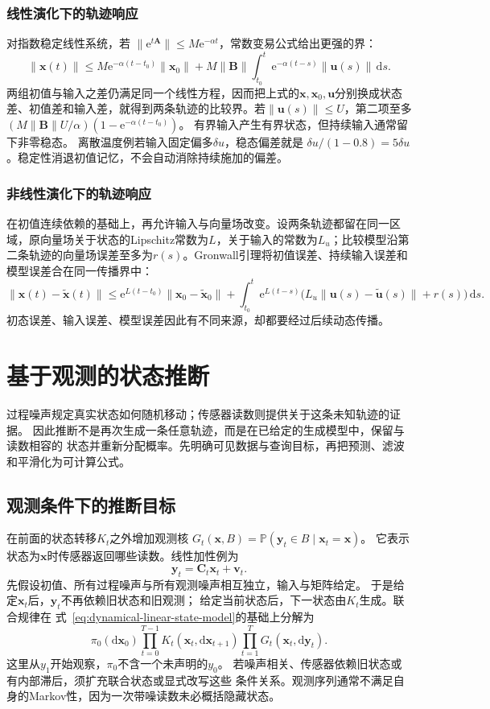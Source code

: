 \subsubsection{线性演化下的轨迹响应}
对指数稳定线性系统，若
$\|\mathrm e^{t\bm A}\|\leq M\mathrm e^{-\alpha t}$，常数变易公式给出更强的界：
\[
  \|\bm x(t)\|
  \leq M\mathrm e^{-\alpha(t-t_0)}\|\bm x_0\|
  +M\|\bm B\|\int_{t_0}^t\mathrm e^{-\alpha(t-s)}\|\bm u(s)\|\,\mathrm ds.
\]
两组初值与输入之差仍满足同一个线性方程，因而把上式的$\bm x,\bm x_0,\bm u$分别换成状态差、初值差和输入差，就得到两条轨迹的比较界。若$\|\bm u(s)\|\leq U$，第二项至多
$(M\|\bm B\|U/\alpha)(1-\mathrm e^{-\alpha(t-t_0)})$。
有界输入产生有界状态，但持续输入通常留下非零稳态。
离散温度例若输入固定偏多$\delta u$，稳态偏差就是
$\delta u/(1-0.8)=5\delta u$。稳定性消退初值记忆，不会自动消除持续施加的偏差。

\subsubsection{非线性演化下的轨迹响应}
在初值连续依赖的基础上，再允许输入与向量场改变。设两条轨迹都留在同一区域，原向量场关于状态的Lipschitz常数为$L$，关于输入的常数为$L_u$；比较模型沿第二条轨迹的向量场误差至多为$r(s)$。Gronwall引理将初值误差、持续输入误差和模型误差合在同一传播界中：
\[
  \|\bm x(t)-\widetilde{\bm x}(t)\|
  \leq \mathrm e^{L(t-t_0)}\|\bm x_0-\widetilde{\bm x}_0\|
  +\int_{t_0}^t\mathrm e^{L(t-s)}
     \bigl(L_u\|\bm u(s)-\widetilde{\bm u}(s)\|+r(s)\bigr)\,\mathrm ds.
\]
初态误差、输入误差、模型误差因此有不同来源，却都要经过后续动态传播。

\section{基于观测的状态推断}
\label{sec:dynamical-state-space-filtering}
\label{sec:dynamical-stochastic-state-observation}

过程噪声规定真实状态如何随机移动；传感器读数则提供关于这条未知轨迹的证据。
因此推断不是再次生成一条任意轨迹，而是在已给定的生成模型中，保留与读数相容的
状态并重新分配概率。先明确可见数据与查询目标，再把预测、滤波和平滑化为可计算公式。

\subsection{观测条件下的推断目标}
在前面的状态转移$K_t$之外增加观测核
$G_t(\bm x,B)=\mathbb P(\bm y_t\in B\mid\bm x_t=\bm x)$。
它表示状态为$\bm x$时传感器返回哪些读数。线性加性例为
\begin{equation}
  \bm y_t=\bm C_t\bm x_t+\bm v_t.
  \label{eq:dynamical-linear-observation-model}
\end{equation}
先假设初值、所有过程噪声与所有观测噪声相互独立，输入与矩阵给定。
于是给定$\bm x_t$后，$\bm y_t$不再依赖旧状态和旧观测；
给定当前状态后，下一状态由$K_t$生成。联合规律在
式~\eqref{eq:dynamical-linear-state-model}的基础上分解为
\[
 \pi_0(\mathrm d\bm x_0)
       \prod_{t=0}^{T-1}K_t(\bm x_t,\mathrm d\bm x_{t+1})
       \prod_{t=1}^T G_t(\bm x_t,\mathrm d\bm y_t).
\]
这里从$y_1$开始观察，$\pi_0$不含一个未声明的$y_0$。
若噪声相关、传感器依赖旧状态或有内部滞后，须扩充联合状态或显式改写这些
条件关系。观测序列通常不满足自身的Markov性，因为一次带噪读数未必概括隐藏状态。

